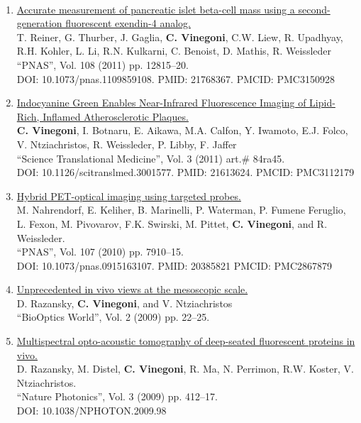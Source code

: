 \documentclass{resume}
\begin{document}
\begin{category}{~~}
\begin{enumerate}
\item
\href{https://tinyurl.com/2495rfpz}{Accurate measurement of pancreatic islet beta-cell mass using a second-generation fluorescent exendin-4 analog.}\\
T. Reiner, G. Thurber, J. Gaglia, {\bf C. Vinegoni}, C.W. Liew, R.
Upadhyay, R.H. Kohler, L. Li, R.N. Kulkarni, C. Benoist, D. Mathis,
R. Weissleder\\
 ``PNAS'', Vol. 108 (2011) pp. 12815--20. \\DOI: 10.1073/pnas.1109859108. PMID: 21768367. PMCID: PMC3150928 

\item
\href{https://tinyurl.com/k274eyac}{Indocyanine Green Enables Near-Infrared Fluorescence Imaging of Lipid-Rich, Inflamed Atherosclerotic Plaques.}\\
{\bf C. Vinegoni}, I. Botnaru, E. Aikawa,
M.A. Calfon, Y. Iwamoto, E.J. Folco, V. Ntziachristos, R. Weissleder, P. Libby, F. Jaffer\\
 ``Science Translational Medicine'', Vol. 3 (2011) art.$\#$ 84ra45. \\DOI: 10.1126/scitranslmed.3001577. PMID: 21613624. PMCID: PMC3112179

\item
\href{https://tinyurl.com/ytvfcw7y}{ Hybrid PET-optical imaging using targeted probes.}\\
M. Nahrendorf, E. Keliher, B. Marinelli, P. Waterman, P. Fumene Feruglio, L. Fexon, M. Pivovarov, F.K. Swirski, M. Pittet,
{\bf C. Vinegoni}, and R. Weissleder.  \\
 ``PNAS'', Vol. 107 (2010) pp. 7910--15. \\DOI: 10.1073/pnas.0915163107. PMID: 20385821 PMCID: PMC2867879

\item
\href{https://tinyurl.com/wj6bzyy}{Unprecedented in vivo views at the mesoscopic scale.}\\
D. Razansky, {\bf C. Vinegoni}, and V. Ntziachristos \\
 ``BioOptics World'', Vol. 2 (2009) pp. 22--25. 

\item
\href{https://tinyurl.com/238k7whp}{Multispectral opto-acoustic tomography of deep-seated fluorescent proteins in vivo.}\\
D. Razansky, M. Distel, {\bf C. Vinegoni}, R. Ma, N. Perrimon, R.W. Koster, V. Ntziachristos. \\
 ``Nature Photonics'', Vol. 3 (2009) pp. 412--17. \\DOI: 10.1038/NPHOTON.2009.98


\end{enumerate}
\end{category}
\end{document}
